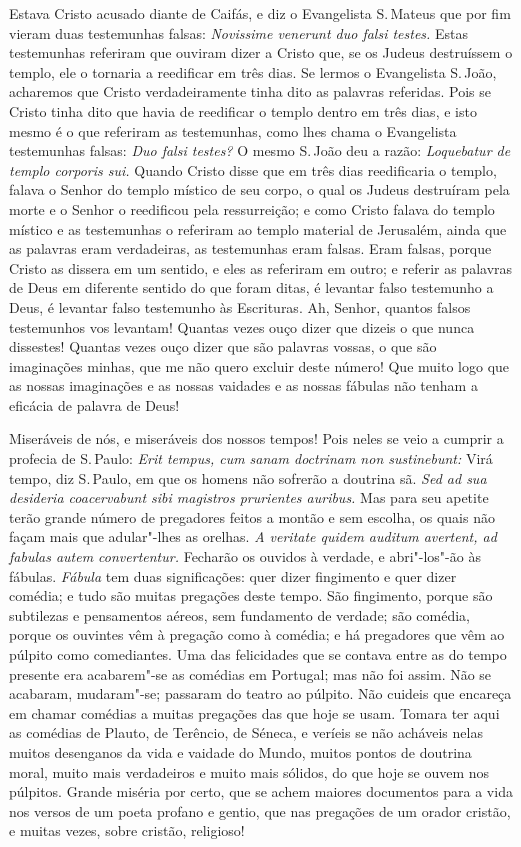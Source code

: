 Estava Cristo acusado diante de Caifás, e diz o Evangelista S.\,Mateus que por fim vieram duas testemunhas falsas: \emph{Novissime
venerunt duo falsi testes.} Estas testemunhas referiram que ouviram
dizer a Cristo que, se os Judeus destruíssem o templo, ele o tornaria a
reedificar em três dias. Se lermos o Evangelista S.\,João, acharemos que
Cristo verdadeiramente tinha dito as palavras referidas. Pois se
Cristo tinha dito que havia de reedificar o templo dentro em três dias,
e isto mesmo é o que referiram as testemunhas, como lhes chama o
Evangelista testemunhas falsas: \emph{Duo falsi testes?} O mesmo S.\,João deu a razão: \emph{Loquebatur de templo corporis sui.} Quando
Cristo disse que em três dias reedificaria o templo, falava o Senhor do templo místico de seu corpo, o qual
os Judeus destruíram pela morte e o Senhor o reedificou pela
ressurreição; e como Cristo falava do templo místico e as testemunhas
o referiram ao templo material de Jerusalém, ainda que as palavras eram
verdadeiras, as testemunhas eram falsas. Eram falsas, porque Cristo as
dissera em um sentido, e eles as referiram em outro; e referir as
palavras de Deus em diferente sentido do que foram ditas, é levantar
falso testemunho a Deus, é levantar falso testemunho às Escrituras. Ah,
Senhor, quantos falsos testemunhos vos levantam! Quantas vezes ouço
dizer que dizeis o que nunca dissestes! Quantas vezes ouço dizer que são
palavras vossas, o que são imaginações minhas, que me não quero excluir
deste número! Que muito logo que as nossas imaginações e as nossas
vaidades e as nossas fábulas não tenham a eficácia de palavra de Deus!

Miseráveis de nós, e miseráveis dos nossos tempos! Pois neles se veio
a cumprir a profecia de S.\,Paulo: \emph{Erit tempus, cum sanam doctrinam
non sustinebunt:} Virá tempo, diz S.\,Paulo, em que os homens não
sofrerão a doutrina sã. \emph{Sed ad sua desideria coacervabunt sibi
magistros prurientes auribus.} Mas para seu apetite terão grande
número de pregadores feitos a montão e sem escolha, os quais não façam
mais que adular"-lhes as orelhas. \emph{A veritate quidem auditum
avertent, ad fabulas autem convertentur.} Fecharão os ouvidos à
verdade, e abri"-los"-ão às fábulas. \emph{Fábula} tem duas
significações: quer dizer fingimento e quer dizer comédia; e tudo são
muitas pregações deste tempo. São fingimento, porque são subtilezas e
pensamentos aéreos, sem fundamento de verdade; são comédia, porque os
ouvintes vêm à pregação como à comédia; e há pregadores que vêm ao
púlpito como comediantes. Uma das felicidades que se contava entre as do
tempo presente era acabarem"-se as comédias em Portugal; mas não foi
assim. Não se acabaram, mudaram"-se; passaram do teatro ao púlpito. Não
cuideis que encareça em chamar comédias a muitas pregações das que
hoje se usam. Tomara ter aqui as comédias de Plauto, de Terêncio, de
Séneca, e veríeis se não acháveis nelas muitos desenganos da vida e
vaidade do Mundo, muitos pontos de doutrina moral, muito mais
verdadeiros e muito mais sólidos, do que hoje
se ouvem nos púlpitos. Grande miséria por certo, que se achem maiores
documentos para a vida nos versos de um poeta profano e gentio, que nas
pregações de um orador cristão, e muitas vezes, sobre cristão,
religioso!


